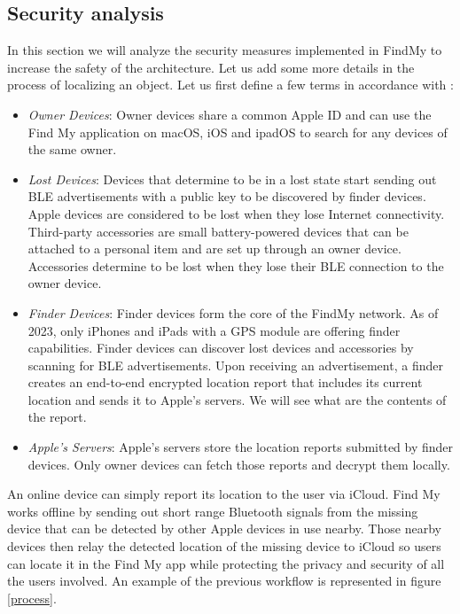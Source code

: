 \documentclass[english]{article}
\begin{document}
\subsection{Security analysis}
In this section we will analyze the security measures implemented in FindMy to increase the safety of the architecture. Let us add some more details in the process of localizing an object.
Let us first define a few terms in accordance with \cite{whocanfind}:
\begin{itemize}
  \item \textit{Owner Devices}: Owner devices share a common Apple ID and can use the Find My application on macOS, iOS and ipadOS to search for any devices of the same owner.
  \item \textit{Lost Devices}: Devices that determine to be in a lost state start sending out BLE advertisements with a public key to be discovered by finder devices. Apple devices are considered to be lost when they lose Internet connectivity. Third-party accessories \cite{gadget} are small battery-powered devices that can be attached to a personal item and are set up through an owner device. Accessories determine to be lost when they lose their BLE connection to the owner device.
  \item \textit{Finder Devices}: Finder devices form the core of the FindMy network. As of 2023, only iPhones and iPads with a GPS module are offering finder capabilities. Finder devices can discover lost devices and accessories by scanning for BLE advertisements. Upon receiving an advertisement, a finder creates an end-to-end encrypted location report that includes its current location and
  sends it to Apple’s servers. We will see what are the contents of the report.
  \item \textit{Apple’s Servers}: Apple’s servers store the location reports submitted by finder devices. Only owner devices can fetch those reports and decrypt them locally.
\end{itemize}
An online device can simply report its location to the user via iCloud. Find My works offline by sending out short range Bluetooth signals from the missing device that can be detected by other Apple devices in use nearby. Those nearby devices then relay the detected location of the missing device to iCloud so users can locate it in the Find My app while protecting the privacy and security of all the users involved. An example of the previous workflow is represented in figure \ref{process}.
\end{document}
